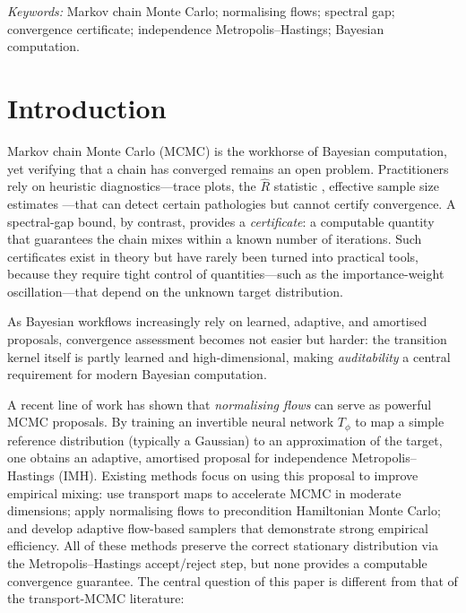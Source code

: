 \documentclass[12pt]{article}
\begin{document}
\noindent%
{\it Keywords:} Markov chain Monte Carlo; normalising flows; spectral gap; convergence certificate; independence Metropolis--Hastings; Bayesian computation.
\vfill

\newpage
{}


\section{Introduction}\label{sec:intro}

Markov chain Monte Carlo (MCMC) is the workhorse of Bayesian computation, yet verifying that a chain has converged remains an open problem.
Practitioners rely on heuristic diagnostics---trace plots, the $\hat{R}$ statistic \citep{GelmanRubin1992, BrooksGelman1998, Vehtari2021}, effective sample size estimates \citep{Vats2019}---that can detect certain pathologies but cannot certify convergence.
A spectral-gap bound, by contrast, provides a \emph{certificate}: a computable quantity that guarantees the chain mixes within a known number of iterations.
Such certificates exist in theory \citep{MengersenTweedie1996, Rosenthal1995, Tierney1994} but have rarely been turned into practical tools, because they require tight control of quantities---such as the importance-weight oscillation---that depend on the unknown target distribution.

As Bayesian workflows increasingly rely on learned, adaptive, and amortised proposals, convergence assessment becomes not easier but harder: the transition kernel itself is partly learned and high-dimensional, making \emph{auditability} a central requirement for modern Bayesian computation.

A recent line of work has shown that \emph{normalising flows} \citep{Rezende2015, Dinh2017, Papamakarios2021} can serve as powerful MCMC proposals.
By training an invertible neural network $T_\phi$ to map a simple reference distribution (typically a Gaussian) to an approximation of the target, one obtains an adaptive, amortised proposal for independence Metropolis--Hastings (IMH).
Existing methods focus on using this proposal to improve empirical mixing: \citet{ParnoMarzouk2018} use transport maps to accelerate MCMC in moderate dimensions; \citet{Hoffman2019NeuTra} apply normalising flows to precondition Hamiltonian Monte Carlo; \citet{Gabrie2022} and \citet{Wong2023flowMC} develop adaptive flow-based samplers that demonstrate strong empirical efficiency.
All of these methods preserve the correct stationary distribution via the Metropolis--Hastings accept/reject step, but none provides a computable convergence guarantee.
The central question of this paper is different from that of the transport-MCMC literature:
\end{document}
